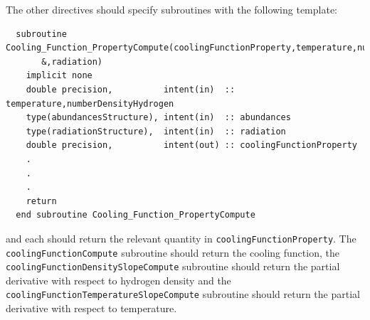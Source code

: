The other directives should specify subroutines with the following template:
\begin{verbatim}
  subroutine Cooling_Function_PropertyCompute(coolingFunctionProperty,temperature,numberDensityHydrogen,abundances&
       &,radiation)
    implicit none
    double precision,          intent(in)  :: temperature,numberDensityHydrogen
    type(abundancesStructure), intent(in)  :: abundances
    type(radiationStructure),  intent(in)  :: radiation
    double precision,          intent(out) :: coolingFunctionProperty
    .
    .
    .
    return
  end subroutine Cooling_Function_PropertyCompute
\end{verbatim}
and each should return the relevant quantity in {\tt coolingFunctionProperty}. The {\tt coolingFunctionCompute} subroutine should return the cooling function, the {\tt coolingFunctionDensitySlopeCompute} subroutine should return the partial derivative with respect to hydrogen density and the {\tt coolingFunctionTemperatureSlopeCompute} subroutine should return the partial derivative with respect to temperature.

